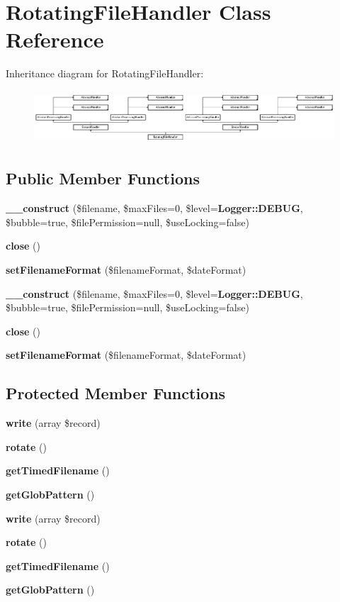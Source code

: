 \section{Rotating\+File\+Handler Class Reference}
\label{class_monolog_1_1_handler_1_1_rotating_file_handler}
Inheritance diagram for Rotating\+File\+Handler\+:\begin{figure}[H]
\begin{center}
\leavevmode
\includegraphics[height=2.000000cm]{class_monolog_1_1_handler_1_1_rotating_file_handler}
\end{center}
\end{figure}
\subsection*{Public Member Functions}
\begin{DoxyCompactItemize}
\item 
{\bf \+\_\+\+\_\+construct} (\$filename, \$max\+Files=0, \$level={\bf Logger\+::\+D\+E\+B\+U\+G}, \$bubble=true, \$file\+Permission=null, \$use\+Locking=false)
\item 
{\bf close} ()
\item 
{\bf set\+Filename\+Format} (\$filename\+Format, \$date\+Format)
\item 
{\bf \+\_\+\+\_\+construct} (\$filename, \$max\+Files=0, \$level={\bf Logger\+::\+D\+E\+B\+U\+G}, \$bubble=true, \$file\+Permission=null, \$use\+Locking=false)
\item 
{\bf close} ()
\item 
{\bf set\+Filename\+Format} (\$filename\+Format, \$date\+Format)
\end{DoxyCompactItemize}
\subsection*{Protected Member Functions}
\begin{DoxyCompactItemize}
\item 
{\bf write} (array \$record)
\item 
{\bf rotate} ()
\item 
{\bf get\+Timed\+Filename} ()
\item 
{\bf get\+Glob\+Pattern} ()
\item 
{\bf write} (array \$record)
\item 
{\bf rotate} ()
\item 
{\bf get\+Timed\+Filename} ()
\item 
{\bf get\+Glob\+Pattern} ()
\end{DoxyCompactItemize}
